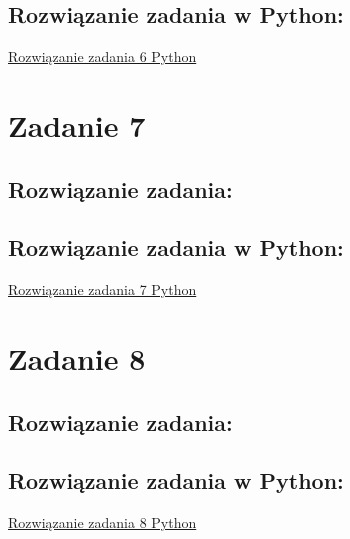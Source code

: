 \documentclass{article}
\begin{document}
	\subsection*{Rozwiązanie zadania w Python:}
	\href{https://github.com/slaw999999999/OEI/blob/main/Zadanie1.ipynb}{Rozwiązanie zadania 6 Python}
	
	\newpage
	\section*{Zadanie 7}
	
	
	\subsection*{Rozwiązanie zadania:}
	
	
	\subsection*{Rozwiązanie zadania w Python:}
	\href{https://github.com/slaw999999999/OEI/blob/main/Zadanie1.ipynb}{Rozwiązanie zadania 7 Python}
	
	\newpage
	\section*{Zadanie 8}
	
	
	\subsection*{Rozwiązanie zadania:}
	
	
	\subsection*{Rozwiązanie zadania w Python:}
	\href{https://github.com/slaw999999999/OEI/blob/main/Zadanie1.ipynb}{Rozwiązanie zadania 8 Python}
\end{document}
